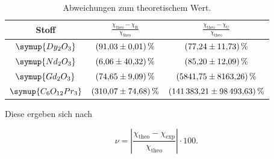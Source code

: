 \begin{table}
\centering
\caption{Abweichungen zum theoretischem Wert.}
\label{tab:Messdaten8}
\begin{tabular}{c c c}
\toprule
Stoff & $\frac{\chi_\text{theo}-\chi_\text{R}}{\chi_\text{theo}}$ & $\frac{\chi_\text{theo}-\chi_\text{U}}{\chi_\text{theo}}$\\ 
\midrule
$\symup{Dy_2O_3}$       & $\SI{91.03+-0.01}{\percent}$ & $\SI{77.24+-11.73}{\percent}$\\
$\symup{Nd_2O_3}$       & $\SI{6.06+-40.32}{\percent}$ & $\SI{85.20+-12.09}{\percent}$\\
$\symup{Gd_2O_3}$       & $\SI{74.65+-9.09}{\percent}$ & $\SI{5841.75+-8163.26}{\percent}$\\
$\symup{C_6O_{12}Pr_3}$ & $\SI{310.07+-74.68}{\percent}$ & $\SI{141383.21+-98493.63}{\percent}$\\
\bottomrule
\end{tabular}
\end{table}

Diese ergeben sich nach 

\begin{equation*}
\nu = \left|\frac{\chi_\text{theo}-\chi_\text{exp}}{\chi_\text{theo}}\right| \cdot 100.
\end{equation*}
